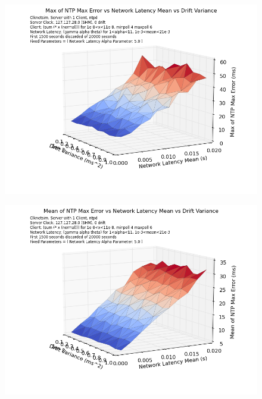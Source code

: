 \begin{figure}[h]
  \caption{}
  \label{fig:max-mean-var-drift}
  \includegraphics[width=1\linewidth]{max_max_err-mean_latency-drift_variance.png}
\end{figure}

\begin{figure}[h]
  \caption{}
  \label{fig:mean-mean-var-drift}
  \includegraphics[width=1\linewidth]{mean_max_err-mean_latency-drift_variance.png}
\end{figure}

